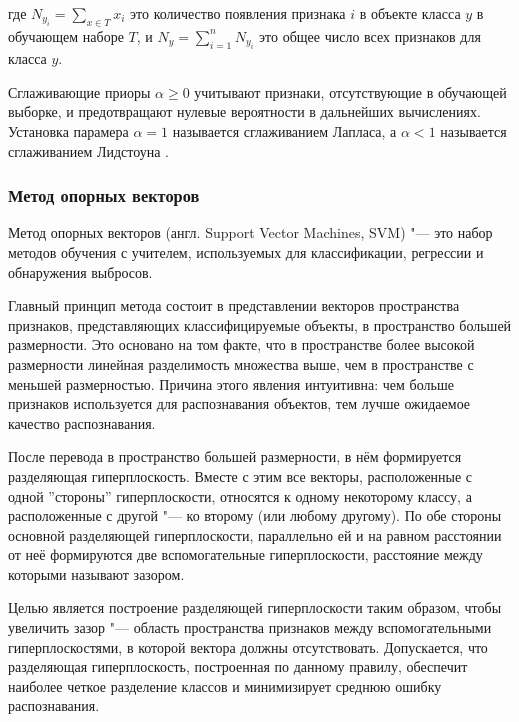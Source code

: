 \documentclass[bachelor, och, coursework]{SCWorks}
\begin{document}
            где $N_{y_i} = \sum_{x \in T} x_i$ это количество появления признака
            $i$ в объекте класса $y$ в обучающем наборе $T$, и $N_y = \sum_{i =
            1}^{n} N_{y_i}$ это общее число всех признаков для класса $y$.

            Сглаживающие приоры $\alpha \geq 0$ учитывают признаки,
            отсутствующие в обучающей выборке, и предотвращают нулевые
            вероятности в дальнейших вычислениях. Установка парамера $\alpha =
            1$ называется сглаживанием Лапласа, а $\alpha < 1$ называется
            сглаживанием Лидстоуна \cite{fwsl}.

        \subsubsection{Метод опорных векторов}


            Метод опорных векторов (англ. Support Vector Machines, SVM) "--- это
            набор методов обучения с учителем, используемых для классификации,
            регрессии и обнаружения выбросов.

            Главный принцип метода состоит в представлении векторов пространства
            признаков, представляющих классифицируемые объекты, в пространство
            большей размерности. Это основано на том факте, что в пространстве
            более высокой размерности линейная разделимость множества выше, чем
            в пространстве с меньшей размерностью. Причина этого явления
            интуитивна: чем больше признаков используется для распознавания
            объектов, тем лучше ожидаемое качество распознавания.


            После перевода в пространство большей размерности, в нём формируется
            разделяющая гиперплоскость. Вместе с этим все векторы, расположенные
            с одной ''стороны'' гиперплоскости, относятся к одному некоторому
            классу, а расположенные с другой "--- ко второму (или любому
            другому). По обе стороны основной разделяющей гиперплоскости,
            параллельно ей и на равном расстоянии от неё формируются две
            вспомогательные гиперплоскости, расстояние между которыми называют
            зазором.

            Целью является построение разделяющей гиперплоскости таким образом,
            чтобы увеличить зазор "--- область пространства признаков между
            вспомогательными гиперплоскостями, в которой вектора должны
            отсутствовать. Допускается, что разделяющая гиперплоскость,
            построенная по данному правилу, обеспечит наиболее четкое разделение
            классов и минимизирует среднюю ошибку распознавания.
\end{document}
